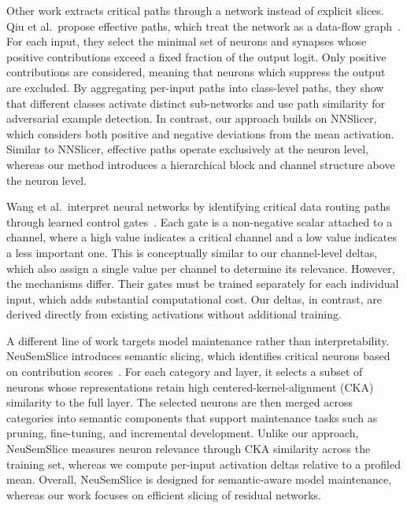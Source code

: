 \documentclass[
12pt,
fancyheadings,
a4paper,
twoside,
BCOR=0.7cm,
nobcorignoretitle,
grayscalebody,
]{stsreprt}
\begin{document}
Other work extracts critical paths through a network instead of explicit slices.
Qiu et al.\ propose effective paths, which treat the network as a data-flow
graph~\cite{qiu2019adversarial}.
For each input, they select the minimal set of neurons and synapses whose positive contributions
exceed a fixed fraction of the output logit.
Only positive contributions are considered, meaning that neurons which suppress the output are
excluded.
By aggregating per-input paths into class-level paths, they show that different classes activate
distinct sub-networks and use path similarity for adversarial example detection.
In contrast, our approach builds on NNSlicer, which considers both positive and negative deviations
from the mean activation.
Similar to NNSlicer, effective paths operate exclusively at the neuron level, whereas our method
introduces a hierarchical block and channel structure above the neuron level.

Wang et al.\ interpret neural networks by identifying critical data routing paths through learned
control gates~\cite{wang2018interpret}.
Each gate is a non-negative scalar attached to a channel, where a high value indicates a critical
channel and a low value indicates a less important one.
This is conceptually similar to our channel-level deltas, which also assign a single value per
channel to determine its relevance.
However, the mechanisms differ.
Their gates must be trained separately for each individual input, which adds substantial
computational cost.
Our deltas, in contrast, are derived directly from existing activations without additional
training.

A different line of work targets model maintenance rather than interpretability.
NeuSemSlice introduces semantic slicing, which identifies critical neurons based on contribution
scores~\cite{zhou2024neusemslice}.
For each category and layer, it selects a subset of neurons whose representations retain high
centered-kernel-alignment (CKA) similarity to the full layer.
The selected neurons are then merged across categories into semantic components that support
maintenance tasks such as pruning, fine-tuning, and incremental development.
Unlike our approach, NeuSemSlice measures neuron relevance through CKA similarity across the
training set, whereas we compute per-input activation deltas relative to a profiled mean.
Overall, NeuSemSlice is designed for semantic-aware model maintenance, whereas our work focuses on
efficient slicing of residual networks.
\end{document}
